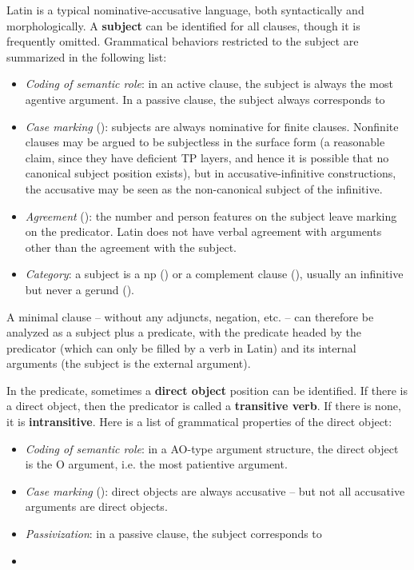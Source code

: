 \documentclass{article}
\newcommand*{\concept}[1]{\textbf{#1}}
\begin{document}
Latin is a typical nominative-accusative language, both syntactically and morphologically.
A \concept{subject} can be identified for all clauses, though it is frequently omitted.
Grammatical behaviors restricted to the subject are summarized in the following list: 
\begin{itemize}
    \item \emph{Coding of semantic role}: in an active clause, 
    the subject is always the most agentive argument.
    In a passive clause, the subject always corresponds to %
    \item \emph{Case marking} (): 
    subjects are always nominative for finite clauses. 
    Nonfinite clauses may be argued to be subjectless in the surface form 
    (a reasonable claim, since they have deficient TP layers, 
    and hence it is possible that no canonical subject position exists),
    but in accusative-infinitive constructions, %
    the accusative may be seen as the non-canonical subject of the infinitive.
    \item \emph{Agreement} (): 
    the number and person features on the subject leave marking on the predicator.
    Latin does not have verbal agreement with arguments other than the agreement with the subject.
    \item \emph{Category}: a subject is a \ac{np} () 
    or a complement clause (), 
    usually an infinitive but never a gerund ().
\end{itemize}

A minimal clause -- without any adjuncts, negation, etc. -- can therefore be analyzed as 
a subject plus a predicate,
with the predicate headed by the predicator (which can only be filled by a verb in Latin) 
and its internal arguments
(the subject is the external argument).

In the predicate, sometimes a \concept{direct object} position can be identified.
If there is a direct object, then the predicator is called a \concept{transitive verb}.
If there is none, it is \concept{intransitive}.
Here is a list of grammatical properties of the direct object:
\begin{itemize}
    \item \emph{Coding of semantic role}: in a AO-type argument structure, 
    the direct object is the O argument, i.e. the most patientive argument. 

    \item \emph{Case marking} (): direct objects are always accusative -- 
    but not all accusative arguments are direct objects.
    \item \emph{Passivization}: in a passive clause, the subject corresponds to 
    \item %
\end{itemize}
\end{document}
